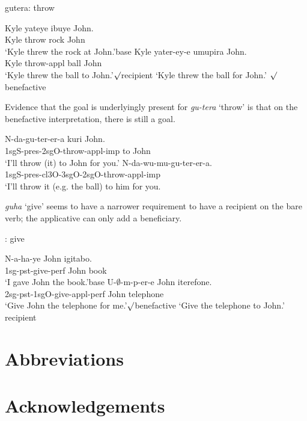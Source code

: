 \documentclass[output=paper]{langsci/langscibook}
\begin{document}
\begin{exe}
\ex\label{rock}{\sc gutera}: throw
	\begin{xlist}
\ex\gll Kyle yateye ibuye John.\\
	Kyle throw rock John\\
	\glt `Kyle threw the rock at John.'\hfill base
	\ex\label{recipe}\gll Kyle yater-ey-e umupira John.\\
	Kyle throw-appl	ball John\\
	\glt `Kyle threw the ball to John.'\hfill $\surd$recipient
	\glt  `Kyle threw the ball for John.'	\hfill	$\surd$benefactive
\end{xlist}
\end{exe}

		 

			 Evidence that the goal is underlyingly present for \emph{gu-tera} `throw' is that on the benefactive interpretation, there is still a goal. 
			
			\begin{exe}
				\ex\begin{xlist}
					\ex\gll N-da-gu-ter-er-a kuri John.\\
							1{\sc sgS-pres-2sgO}-throw-{\sc appl-imp} to John\\
							\glt `I'll throw (it) to John for you.'
				\ex\gll N-da-wu-mu-gu-ter-er-a.\\
					1{\sc sgS-pres-cl3O-3sgO-2sgO}-throw-{\sc appl-imp}\\
					\glt `I'll throw it (e.g. the ball) to him for you.
			\end{xlist}
			\end{exe}
		
		 

 \emph{guha} `give' seems to have a narrower requirement to have a recipient on the bare verb; the applicative can only add a beneficiary. 



\begin{exe}
: give%
\begin{xlist}
	\ex\gll N-a-ha-ye John igitabo.\\
		{\sc 1sg-pst-}give-{\sc perf} John book\\
		\glt `I gave John the book.'\hfill base
	\ex\gll U-$\emptyset$-m-p-er-e John iterefone.\\
		{\sc 2sg-pst-1sgO-}give-{\sc appl-perf} John telephone\\
		\glt `Give John the telephone for me.'\hfill $\surd$benefactive
		\glt *`Give the telephone to John.' \hfill *recipient
	\end{xlist}
\end{exe}


\section*{Abbreviations}
\section*{Acknowledgements}

\printbibliography[heading=subbibliography,notkeyword=this]
\end{document}
